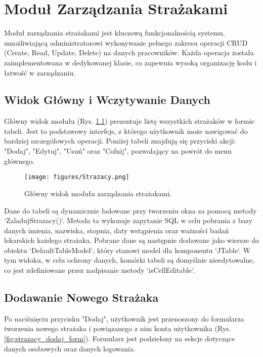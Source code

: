 \chapter{Moduł Zarządzania Strażakami}
\label{chap:strazacy}

Moduł zarządzania strażakami jest kluczową funkcjonalnością systemu, umożliwiającą administratorowi wykonywanie pełnego zakresu operacji CRUD (Create, Read, Update, Delete) na danych pracowników. Każda operacja została zaimplementowana w dedykowanej klasie, co zapewnia wysoką organizację kodu i łatwość w zarządzaniu.

\section{Widok Główny i Wczytywanie Danych}
\label{sec:strazacy_widok}

Główny widok modułu (Rys. \ref{fig:strazacy}) prezentuje listę wszystkich strażaków w formie tabeli. Jest to podstawowy interfejs, z którego użytkownik może nawigować do bardziej szczegółowych operacji. Poniżej tabeli znajdują się przyciski akcji: "Dodaj", "Edytuj", "Usuń" oraz "Cofnij", pozwalający na powrót do menu głównego.

\begin{figure}[H]
	\centering
	\texttt{[image: figures/Strazacy.png]}
	\caption{Główny widok modułu zarządzania strażakami.}
	\label{fig:strazacy}
\end{figure}

Dane do tabeli są dynamicznie ładowane przy tworzeniu okna za pomocą metody `ZaladujStrazacy()`. Metoda ta wykonuje zapytanie SQL w celu pobrania z bazy danych imienia, nazwiska, stopnia, daty wstąpienia oraz ważności badań lekarskich każdego strażaka. Pobrane dane są następnie dodawane jako wiersze do obiektu `DefaultTableModel`, który stanowi model dla komponentu `JTable`. W tym widoku, w celu ochrony danych, komórki tabeli są domyślnie nieedytowalne, co jest zdefiniowane przez nadpisanie metody `isCellEditable`.

\section{Dodawanie Nowego Strażaka}
\label{sec:strazacy_dodaj}

Po naciśnięciu przycisku "Dodaj", użytkownik jest przenoszony do formularza tworzenia nowego strażaka i powiązanego z nim konta użytkownika (Rys. \ref{fig:strazacy_dodaj_form}). Formularz jest podzielony na sekcje dotyczące danych osobowych oraz danych logowania.

